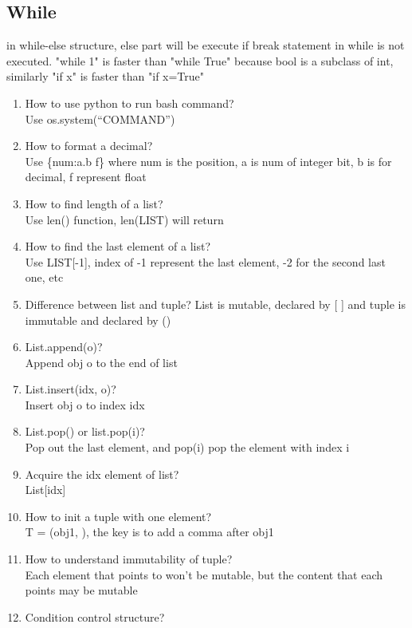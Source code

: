 \documentclass[10pt,a4paper,oneside]{article}
\begin{document}
\subsection{While}
in while-else structure, else part will be execute if break statement in while is not executed.
"while 1" is faster than "while True" because bool is a subclass of int, similarly "if x" is faster than "if x=True"

\begin{enumerate}

	\item How to use python to run bash command?\\
	Use os.system(“COMMAND”)


	\item How to format a decimal?\\
	Use \{num:a.b f\} where num is the position, a is num of integer bit, b is for decimal, f represent float
	\item How to find length of a list?\\
	Use len() function, len(LIST) will return
	\item How to find the last element of a list?\\
	Use LIST[-1], index of -1 represent the last element, -2 for the second last one, etc
	\item Difference between list and tuple?
	List is mutable, declared by [ ] and tuple is immutable and declared by ()
	\item List.append(o)?\\
	Append obj o to the end of list
	\item List.insert(idx, o)?\\
	Insert obj o to index idx
	\item List.pop() or list.pop(i)?\\
	Pop out the last element, and pop(i) pop the element with index i
	\item Acquire the idx element of list?\\
	List[idx]
	\item How to init a tuple with one element?\\
	T = (obj1, ), the key is to add a comma after obj1
	\item How to understand immutability of tuple?\\
	Each element that points to won't be mutable, but the content that each points may be mutable
	\item Condition control structure?\\

\end{enumerate}
\end{document}
